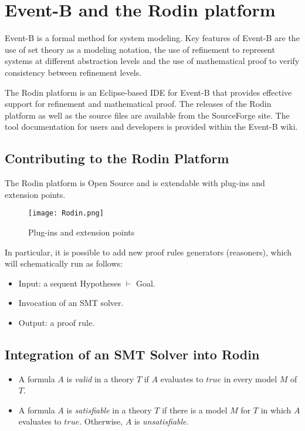 \section{Event-B and the Rodin platform}
Event-B is a formal method for system modeling. Key features of Event-B are the use of set theory as a modeling notation, the use of refinement to represent systems at different abstraction levels and the use of mathematical proof to verify consistency between refinement levels.

The Rodin platform is an Eclipse\cite{ECLIPSE}-based IDE for Event-B that provides effective support for refinement and mathematical proof. The releases\cite{RODIN} of the Rodin platform as well as the source files\cite{SOURCES} are available from the SourceForge site. The tool documentation for users and developers is provided within the Event-B wiki\cite{WIKI}.

\subsection{Contributing to the Rodin Platform}
The Rodin platform is Open Source and is extendable with plug-ins and extension points.

\begin{figure}
\centering
\texttt{[image: Rodin.png]}
\caption{Plug-ins and extension points} 
\label{Fig:Rodin Platform}
\end{figure}

In particular, it is possible to add new proof rules generators (reasoners), which will schematically run as follows:
\begin{itemize}
\item Input: a sequent Hypotheses $\vdash$ Goal.
\item Invocation of an SMT solver.
\item Output: a proof rule.
\end{itemize}

\subsection{Integration of an SMT Solver into Rodin}
\begin{itemize}
\item A formula $A$ is \textit{valid} in a theory $T$ if $A$ evaluates to $true$ in every model $M$ of $T$.
\item A formula $A$ is \textit{satisfiable} in a theory $T$ if there is a model $M$ for $T$ in which $A$ evaluates to $true$. Otherwise, $A$ is \textit{unsatisfiable}.
\end{itemize}

